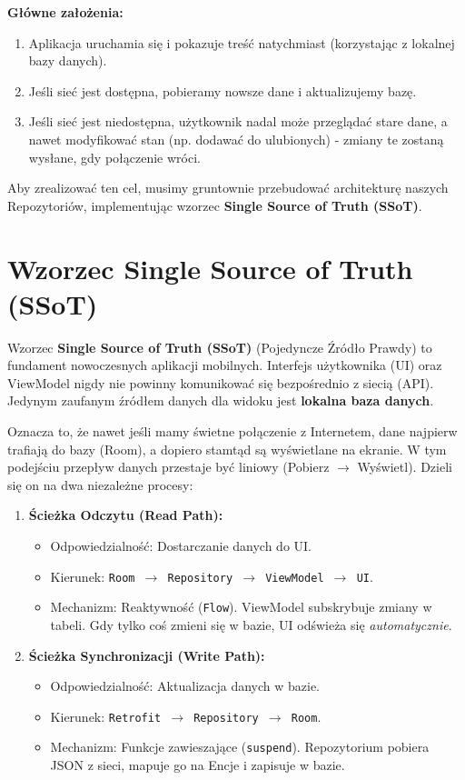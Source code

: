 \textbf{Główne założenia:}
\begin{enumerate}
    \item Aplikacja uruchamia się i pokazuje treść natychmiast (korzystając z lokalnej bazy danych).
    \item Jeśli sieć jest dostępna, pobieramy nowsze dane i aktualizujemy bazę.
    \item Jeśli sieć jest niedostępna, użytkownik nadal może przeglądać stare dane, a nawet modyfikować stan (np. dodawać do ulubionych) - zmiany te zostaną wysłane, gdy połączenie wróci.
\end{enumerate}

Aby zrealizować ten cel, musimy gruntownie przebudować architekturę naszych Repozytoriów, implementując wzorzec \textbf{Single Source of Truth (SSoT)}.

\section{Wzorzec Single Source of Truth (SSoT)}

Wzorzec \textbf{Single Source of Truth (SSoT)} (Pojedyncze Źródło Prawdy) to fundament nowoczesnych aplikacji mobilnych. Interfejs użytkownika (UI) oraz ViewModel nigdy nie powinny komunikować się bezpośrednio z siecią (API). Jedynym zaufanym źródłem danych dla widoku jest \textbf{lokalna baza danych}.

Oznacza to, że nawet jeśli mamy świetne połączenie z Internetem, dane najpierw trafiają do bazy (Room), a dopiero stamtąd są wyświetlane na ekranie. W tym podejściu przepływ danych przestaje być liniowy (Pobierz $\rightarrow$ Wyświetl). Dzieli się on na dwa niezależne procesy:

\begin{enumerate}
    \item \textbf{Ścieżka Odczytu (Read Path):}
    \begin{itemize}
        \item Odpowiedzialność: Dostarczanie danych do UI.
        \item Kierunek: \texttt{Room $\rightarrow$ Repository $\rightarrow$ ViewModel $\rightarrow$ UI}.
        \item Mechanizm: Reaktywność (\texttt{Flow}). ViewModel subskrybuje zmiany w tabeli. Gdy tylko coś zmieni się w bazie, UI odświeża się \textit{automatycznie}.
    \end{itemize}
    
    \item \textbf{Ścieżka Synchronizacji (Write Path):}
    \begin{itemize}
        \item Odpowiedzialność: Aktualizacja danych w bazie.
        \item Kierunek: \texttt{Retrofit $\rightarrow$ Repository $\rightarrow$ Room}.
        \item Mechanizm: Funkcje zawieszające (\texttt{suspend}). Repozytorium pobiera JSON z sieci, mapuje go na Encje i zapisuje w bazie.
    \end{itemize}
\end{enumerate}


